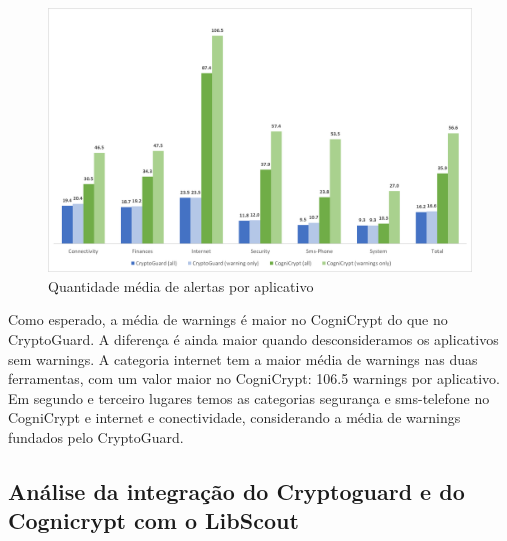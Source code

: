 \begin{figure}[!h]
    \centering
    \includegraphics[scale=0.3]{img/averageWarnings.png}
    \caption{Quantidade média de alertas por aplicativo}
    \label{averageWarnings}
\end{figure}

Como esperado, a média de warnings é maior no CogniCrypt do que no CryptoGuard. A diferença é ainda maior quando desconsideramos os aplicativos sem warnings. A categoria internet tem a maior média de warnings nas duas ferramentas, com um valor maior no CogniCrypt: 106.5 warnings por aplicativo. Em segundo e terceiro lugares temos as categorias segurança e sms-telefone no CogniCrypt e internet e conectividade, considerando a média de warnings fundados pelo CryptoGuard.

\subsection{Análise da integração do Cryptoguard e do Cognicrypt com o LibScout}








